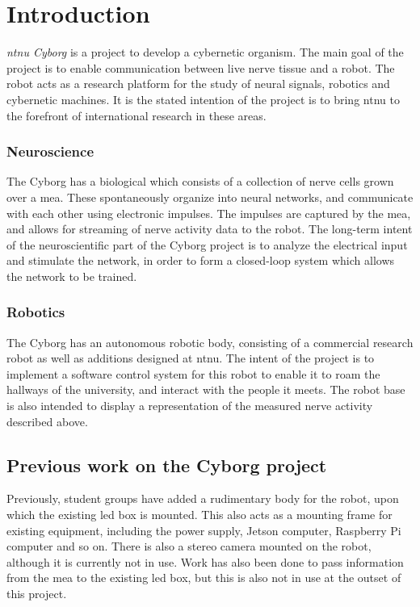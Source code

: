 \documentclass[\rootfolder/main.tex]{subfiles}
\begin{document}
\chapter{Introduction} %
\label{ch:introduction} %

\emph{\acrshort{ntnu} Cyborg} is a project to develop a cybernetic organism.
The main goal of the project is to enable communication between live nerve tissue and a robot.
The robot acts as a research platform for the study of neural signals, robotics and cybernetic machines.
It is the stated intention of the project is to bring \acrshort{ntnu} to the forefront of international research in these areas.

\subsection{Neuroscience}

The Cyborg has a biological  which consists of a collection of nerve cells grown over a \acrfull{mea}.
These spontaneously organize into neural networks, and communicate with each other using electronic impulses.
The impulses are captured by the \acrshort{mea}, and allows for streaming of nerve activity data to the robot.
The long-term intent of the neuroscientific part of the Cyborg project is to analyze the electrical input and stimulate the network, in order to form a closed-loop system which allows the network to be trained.

\subsection{Robotics}

The Cyborg has an autonomous robotic body, consisting of a commercial research robot as well as additions designed at \acrshort{ntnu}.
The intent of the project is to implement a software control system for this robot to enable it to roam the hallways of the university, and interact with the people it meets.
The robot base is also intended to display a representation of the measured nerve activity described above.

\section{Previous work on the Cyborg project}

Previously, student groups have added a rudimentary body for the robot, upon which the existing \acrshort{led} box is mounted.
This also acts as a mounting frame for existing equipment, including the power supply, Jetson computer, Raspberry Pi computer and so on.
There is also a stereo camera mounted on the robot, although it is currently not in use.
Work has also been done to pass information from the \acrlong{mea} to the existing \acrshort{led} box, but this is also not in use at the outset of this project.
\end{document}
